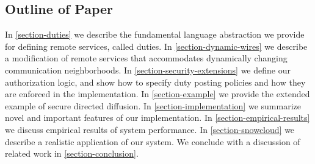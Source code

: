\subsection{Outline of Paper}

In \autoref{section-duties} we describe the fundamental language
abstraction we provide for defining remote services, called duties. In
\autoref{section-dynamic-wires} we describe a modification of remote
services that accommodates dynamically changing communication
neighborhoods. In \autoref{section-security-extensions} we define our
authorization logic, and show how to specify duty posting policies and
how they are enforced in the implementation. In
\autoref{section-example} we provide the extended example of secure
directed diffusion. In \autoref{section-implementation} we summarize
novel and important features of our implementation. In
\autoref{section-empirical-results} we discuss empirical results of
system performance. In \autoref{section-snowcloud} we describe a
realistic application of our system. We conclude with a discussion of
related work in \autoref{section-conclusion}.



